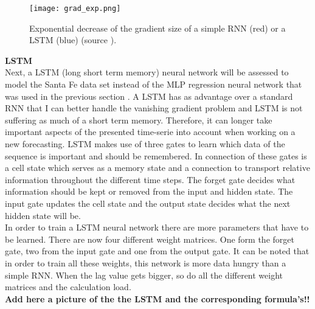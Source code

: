 \begin{figure}[h!]
	\centering
	\texttt{[image: grad\_exp.png]}
	\caption{Exponential decrease of the gradient size of a simple RNN (red) or a LSTM (blue) (source \cite{Teuwen2019}).}
	\label{fig:grad_exp}
\end{figure}


\textbf{LSTM}\\
Next, a LSTM (long short term memory) neural network will be assessed to model the Santa Fe data set instead of the MLP regression neural network that was used in the previous section . A LSTM has as advantage over a standard RNN that I can better handle the vanishing gradient problem and LSTM is not suffering as much of a short term memory. Therefore, it can  longer take important aspects of the presented time-serie into account when working on a new forecasting. LSTM makes use of three gates to learn which data of the sequence is important and should be remembered. In connection of these gates is a cell state which serves as a memory state and a connection to transport relative information throughout the different time steps. The forget gate decides what information should be kept or removed from the input and hidden state. The input gate updates the cell state and the output state decides what the next hidden state will be.\\
In order to train a LSTM neural network there are more parameters that have to be learned.  There are now four different weight matrices. One form the forget gate, two from the input gate and one from the output gate. It can be noted that in order to train all these weights, this network is more data hungry than a simple RNN. When the lag value gets bigger, so do all the different weight matrices and the calculation load.\\

\textbf{Add here a picture of the the LSTM and the corresponding formula's!!}
 





